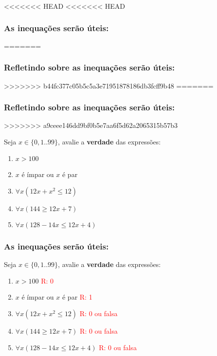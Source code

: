 \documentclass{beamer}
\begin{document}
\begin{frame}
<<<<<<< HEAD
<<<<<<< HEAD
\frametitle{As inequações serão úteis:}
=======
\frametitle{Refletindo sobre as inequações serão úteis:}
>>>>>>> b44fc377c05b5c5a3e71951878186db3fcff9b48
=======
\frametitle{Refletindo sobre as inequações serão úteis:}
>>>>>>> a9ceee146dd9bf0b5e7aa6f5d62a2065315b57b3

\begin{exampleblock}
{Seja $x \in \{0,1..99\}$, avalie a \textbf{verdade} das expressões:}
\begin{enumerate}
  
  \item $ x > 100$
  
  \item $x$ é ímpar ou $x$ é par
  
  \item $\forall x(12x + x^2 \le 12)$

  \item $\forall x(144 \ge 12x + 7)$

  \item $\forall x(128 - 14x \le 12x + 4)$
      
      
\end{enumerate}
\end{exampleblock}
\end{frame}


\begin{frame}
\frametitle{As inequações serão úteis:}

\begin{exampleblock}
{Seja $x \in \{0,1..99\}$, avalie a \textbf{verdade} das expressões:}
\begin{enumerate}
  
  \item $ x > 100$ \hspace{1cm} \textcolor{red}{R: 0}
  
  \item $x$ é ímpar ou $x$ é par \hspace{1cm} \textcolor{red}{R: 1}

  
  \item $\forall x(12x + x^2 \le 12)$
\hspace{1cm} \textcolor{red}{R: 0 ou falsa}



  \item $\forall x(144 \ge 12x + 7)$ 
\hspace{1cm} \textcolor{red}{R: 0 ou falsa}

  \item $\forall x(128 - 14x \le 12x + 4)$ 
\hspace{1cm} \textcolor{red}{R: 0 ou falsa}
      
\end{enumerate}
\end{exampleblock}
\end{frame}
\end{document}
